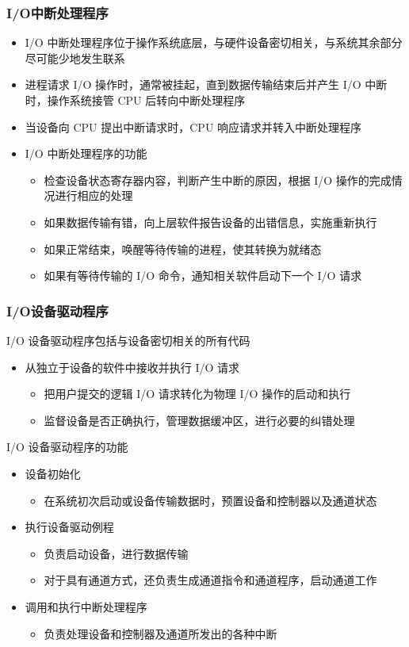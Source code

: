 \documentclass[cs4size,a4paper,10pt]{ctexart}
\begin{document}
	\subsubsection{I/O中断处理程序}
	\begin{itemize}
		\item I/O 中断处理程序位于操作系统底层，与硬件设备密切相关，与系统其余部分尽可能少地发生联系
		\item 进程请求 I/O 操作时，通常被挂起，直到数据传输结束后并产生 I/O 中断时，操作系统接管 CPU 后转向中断处理程序
		\item 当设备向 CPU 提出中断请求时，CPU 响应请求并转入中断处理程序
		\item I/O 中断处理程序的功能
		\begin{itemize}
			\item 检查设备状态寄存器内容，判断产生中断的原因，根据 I/O 操作的完成情况进行相应的处理
			\item 如果数据传输有错，向上层软件报告设备的出错信息，实施重新执行
			\item 如果正常结束，唤醒等待传输的进程，使其转换为就绪态
			\item 如果有等待传输的 I/O 命令，通知相关软件启动下一个 I/O 请求
		\end{itemize}
	\end{itemize}

	\subsubsection{I/O设备驱动程序}
	I/O 设备驱动程序包括与设备密切相关的所有代码
	\begin{itemize}
		\item 从独立于设备的软件中接收并执行 I/O 请求
		\begin{itemize}
			\item 把用户提交的逻辑 I/O 请求转化为物理 I/O 操作的启动和执行
			\item 监督设备是否正确执行，管理数据缓冲区，进行必要的纠错处理
		\end{itemize}
	\end{itemize}

	I/O 设备驱动程序的功能
	\begin{itemize}
		\item 设备初始化
		\begin{itemize}
			\item 在系统初次启动或设备传输数据时，预置设备和控制器以及通道状态
		\end{itemize}
		\item 执行设备驱动例程
		\begin{itemize}
			\item 负责启动设备，进行数据传输
			\item 对于具有通道方式，还负责生成通道指令和通道程序，启动通道工作
		\end{itemize}
		\item 调用和执行中断处理程序
		\begin{itemize}
			\item 负责处理设备和控制器及通道所发出的各种中断
		\end{itemize}
	\end{itemize}
\end{document}
